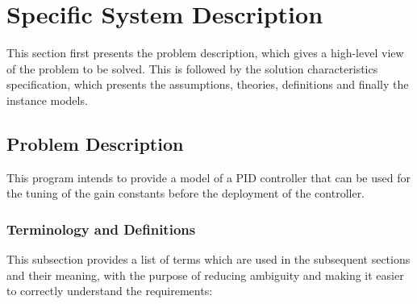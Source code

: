 \documentclass[12pt]{article}
\begin{document}
\section{Specific System Description}

This section first presents the problem description, which gives a high-level
view of the problem to be solved.  This is followed by the solution characteristics
specification, which presents the assumptions, theories, definitions and finally
the instance models.  

\subsection{Problem Description} \label{Sec_pd}

This program intends to provide a model of a PID controller that can be used 
for the tuning of the gain constants before the deployment of the controller.

\subsubsection{Terminology and  Definitions}


This subsection provides a list of terms which are used in the subsequent
sections and their meaning, with the purpose of reducing ambiguity and making it
easier to correctly understand the requirements:
\end{document}
